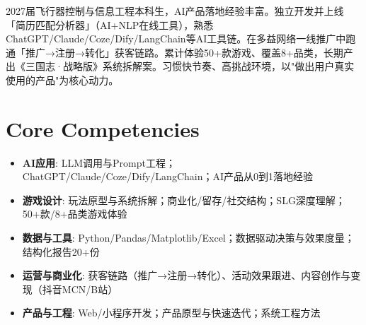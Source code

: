 \documentclass[11pt,a4paper,sans]{moderncv}
\begin{document}
\makecvtitle


\vspace{6pt}
\small{2027届飞行器控制与信息工程本科生，AI产品落地经验丰富。独立开发并上线「简历匹配分析器」（AI+NLP在线工具），熟悉ChatGPT/Claude/Coze/Dify/LangChain等AI工具链。在多益网络一线推广中跑通「推广→注册→转化」获客链路。累计体验50+款游戏、覆盖8+品类，长期产出《三国志·战略版》系统拆解案。习惯快节奏、高挑战环境，以"做出用户真实使用的产品"为核心动力。}


\section{Core Competencies}
\vspace{1pt}
\begin{itemize}

\item \textbf{AI应用}: LLM调用与Prompt工程；ChatGPT/Claude/Coze/Dify/LangChain；AI产品从0到1落地经验

\item \textbf{游戏设计}: 玩法原型与系统拆解；商业化/留存/社交结构；SLG深度理解；50+款/8+品类游戏体验

\item \textbf{数据与工具}: Python/Pandas/Matplotlib/Excel；数据驱动决策与效果度量；结构化报告20+份

\item \textbf{运营与商业化}: 获客链路（推广→注册→转化）、活动效果跟进、内容创作与变现（抖音MCN/B站）

\item \textbf{产品与工程}: Web/小程序开发；产品原型与快速迭代；系统工程方法

\end{itemize}

\end{document}

